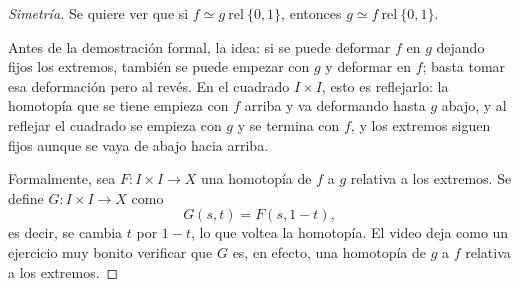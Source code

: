 \documentclass[11pt]{article}
\begin{document}
\begin{proof}[Simetría]
Se quiere ver que si $f\simeq g\ \mathrm{rel}\ \{0,1\}$, entonces $g\simeq f\ \mathrm{rel}\ \{0,1\}$.

Antes de la demostración formal, la idea: si se puede deformar $f$ en $g$ dejando fijos los extremos, también se puede empezar con $g$ y deformar en $f$; basta tomar esa deformación pero al revés. En el cuadrado $I\times I$, esto es reflejarlo: la homotopía que se tiene empieza con $f$ arriba y va deformando hasta $g$ abajo, y al reflejar el cuadrado se empieza con $g$ y se termina con $f$, y los extremos siguen fijos aunque se vaya de abajo hacia arriba.

Formalmente, sea $F\colon I\times I\to X$ una homotopía de $f$ a $g$ relativa a los extremos. Se define $G\colon I\times I\to X$ como
\[
  G(s,t)=F(s,1-t),
\]
es decir, se cambia $t$ por $1-t$, lo que \guillemotleft{}voltea\guillemotright{} la homotopía. El video deja como un ejercicio muy bonito verificar que $G$ es, en efecto, una homotopía de $g$ a $f$ relativa a los extremos.
\end{proof}
\end{document}
